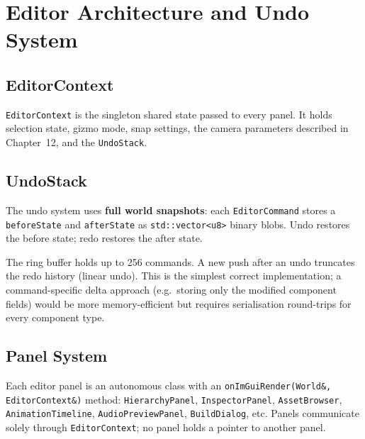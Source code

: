 \chapter{Editor Architecture and Undo System}

\section{EditorContext}

\texttt{EditorContext} is the singleton shared state passed to every
panel. It holds selection state, gizmo mode, snap settings, the camera
parameters described in Chapter~12, and the
\texttt{UndoStack}.

\section{UndoStack}

The undo system uses \textbf{full world snapshots}: each
\texttt{EditorCommand} stores a \texttt{beforeState} and \texttt{afterState}
as \texttt{std::vector<u8>} binary blobs. Undo restores the before state;
redo restores the after state.

The ring buffer holds up to 256 commands. A new push after an undo
truncates the redo history (linear undo). This is the simplest correct
implementation; a command-specific delta approach (e.g.\ storing only
the modified component fields) would be more memory-efficient but
requires serialisation round-trips for every component type.

\section{Panel System}

Each editor panel is an autonomous class with an
\texttt{onImGuiRender(World\&, EditorContext\&)} method:
\texttt{HierarchyPanel}, \texttt{InspectorPanel}, \texttt{AssetBrowser},
\texttt{AnimationTimeline}, \texttt{AudioPreviewPanel},
\texttt{BuildDialog}, etc.
Panels communicate solely through \texttt{EditorContext}; no panel holds
a pointer to another panel.
